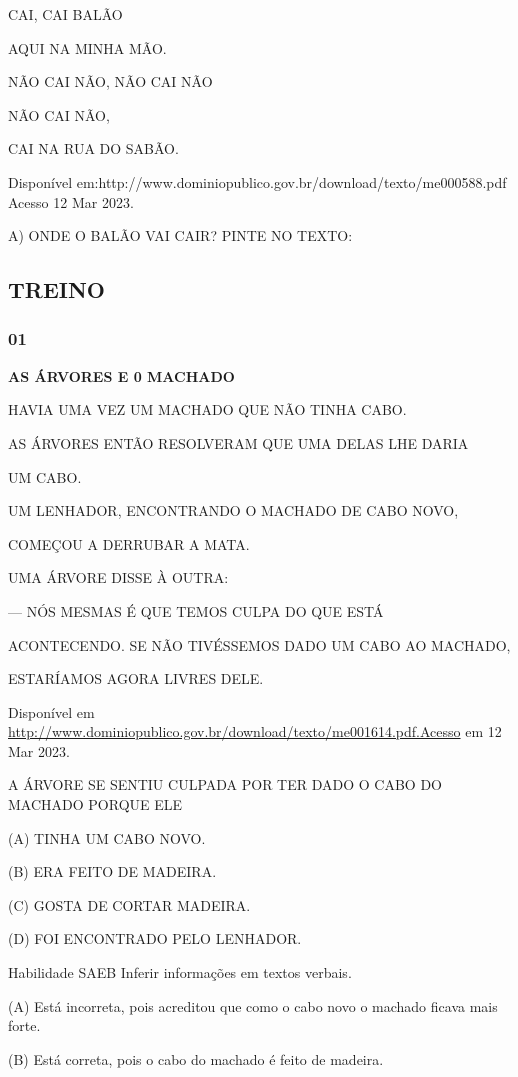 CAI, CAI BALÃO

AQUI NA MINHA MÃO.

NÃO CAI NÃO, NÃO CAI NÃO

NÃO CAI NÃO,

CAI NA RUA DO SABÃO.

Disponível
em:http://www.dominiopublico.gov.br/download/texto/me000588.pdf Acesso
12 Mar 2023.

A) ONDE O BALÃO VAI CAIR? PINTE NO TEXTO:

\subsection{TREINO}\label{treino-5}

\subsubsection{01 }\label{section-78}

\textbf{AS ÁRVORES E 0 MACHADO}

HAVIA UMA VEZ UM MACHADO QUE NÃO TINHA CABO.

AS ÁRVORES ENTÃO RESOLVERAM QUE UMA DELAS LHE DARIA

UM CABO.

UM LENHADOR, ENCONTRANDO O MACHADO DE CABO NOVO,

COMEÇOU A DERRUBAR A MATA.

UMA ÁRVORE DISSE À OUTRA:

--- NÓS MESMAS É QUE TEMOS CULPA DO QUE ESTÁ

ACONTECENDO. SE NÃO TIVÉSSEMOS DADO UM CABO AO MACHADO,

ESTARÍAMOS AGORA LIVRES DELE.

Disponível em
\url{http://www.dominiopublico.gov.br/download/texto/me001614.pdf.Acesso}
em 12 Mar 2023.

A ÁRVORE SE SENTIU CULPADA POR TER DADO O CABO DO MACHADO PORQUE ELE

(A) TINHA UM CABO NOVO.

(B) ERA FEITO DE MADEIRA.

(C) GOSTA DE CORTAR MADEIRA.

(D) FOI ENCONTRADO PELO LENHADOR.

Habilidade SAEB Inferir informações em textos verbais.

(A) Está incorreta, pois acreditou que como o cabo novo o machado ficava
mais forte.

(B) Está correta, pois o cabo do machado é feito de madeira.

